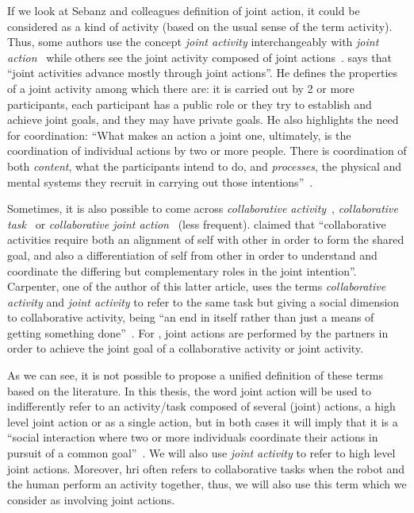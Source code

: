 \documentclass[a4paper,11pt,twoside]{StyleThese}
\begin{document}
If we look at Sebanz and colleagues definition of joint action, it could be considered as a kind of activity (based on the usual sense of the term activity). Thus, some authors use the concept \emph{joint activity} interchangeably with \emph{joint action}~\citep{tollefsen_2005_let,grafenhain_2013_three} while others see the joint activity composed of joint actions~\citep{clark_1996_using, feltovitch_2005_common}. \citet[p~.59]{clark_1996_using} says that ``joint activities advance mostly through joint actions''. He defines the properties of a joint activity among which there are: it is carried out by 2 or more participants, each participant has a public role or they try to establish and achieve joint goals, and they may have private goals. He also highlights the need for coordination: ``What makes an action a joint one, ultimately, is the coordination of individual actions by two or more people. There is coordination of both \emph{content}, what the participants intend to do, and \emph{processes}, the physical and mental systems they recruit in carrying out those intentions''~\citep[p~.59]{clark_1996_using}. 

Sometimes, it is also possible to come across \emph{collaborative activity}~\citep{tomasello_2005_understanding}, \emph{collaborative task}~\citep{brennan_2008_coordinating} or \emph{collaborative joint action}~\citep{godman_2013_we} (less frequent). \citet[p.~681]{tomasello_2005_understanding} claimed that ``collaborative activities require both an alignment of self with other in order to form the shared goal, and also a differentiation of self from other in order to understand and coordinate the differing but complementary roles in the joint intention''. Carpenter, one of the author of this latter article, uses the terms \emph{collaborative activity} and \emph{joint activity} to refer to the same task but giving a social dimension to collaborative activity, being ``an end in itself rather than just a means of getting something done''~\citep[p.~384]{carpenter_2009_just}. For \cite{pacherie_2013_intentional}, joint actions are performed by the partners in order to achieve the joint goal of a collaborative activity or joint activity.

As we can see, it is not possible to propose a unified definition of these terms based on the literature. In this thesis, the word joint action will be used to indifferently refer to an activity/task composed of several (joint) actions, \ie a high level joint action or as a single action, but in both cases it will imply that it is a ``social interaction where two or more individuals coordinate their actions in pursuit of a common goal''~\citep[p.~7598]{castro_2020_joint}. We will also use \textit{joint activity} to refer to high level joint actions. Moreover, \acrshort{hri} often refers to collaborative tasks when the robot and the human perform an activity together, thus, we will also use this term which we consider as involving joint actions.
\end{document}
